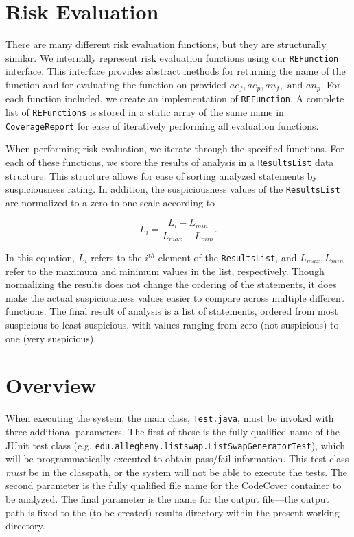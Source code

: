 \section{Risk Evaluation} \label{sec:re}

There are many different risk evaluation functions, but they are structurally similar.  We internally
represent risk evaluation functions using our \texttt{REFunction} interface.  This interface provides
abstract methods for returning the name of the function and for evaluating the function on provided
$ae_f, ae_p, an_f, \text{ and } an_p$.  For each function included, we create an implementation of
\texttt{REFunction}.  A complete list of \texttt{REFunctions} is stored in a static array of the
same name in \texttt{CoverageReport} for ease of iteratively performing all evaluation functions.  

When performing risk evaluation, we iterate through the specified functions.  For each of these
functions, we store the results of analysis in a \texttt{ResultsList} data structure.  This
structure allows for ease of sorting analyzed statements by suspiciousness rating.  In addition, the
suspiciousness values of the \texttt{ResultsList} are normalized to a zero-to-one scale according to

\[ L_i = \frac{ L_i - L_{min} }{ L_{max} - L_{min} }. \]

In this equation, $L_i$ refers to the $i^{th}$ element of the \texttt{ResultsList}, and $L_{max}, L_{min}$ refer to the maximum and minimum values in the list, respectively.  Though normalizing the results does
not change the ordering of the statements, it does make the actual suspiciousness values easier to compare
across multiple different functions.  The final result of analysis is a list of statements, ordered from
most suspicious to least suspicious, with values ranging from zero (not suspicious) to one (very 
suspicious).

\section{Overview} \label{sec:over}

When executing the system, the main class, \texttt{Test.java}, must be invoked with three additional
parameters.  The first of these is the fully qualified name of the JUnit test class (e.g. \texttt{edu.allegheny.listswap.ListSwapGeneratorTest}), which will be programmatically executed to
obtain pass/fail information.  This test class \emph{must} be in the classpath, or the system will
not be able to execute the tests.  The second parameter is the fully qualified file name for the 
CodeCover container to be analyzed.  The final parameter is the name for the output file---the 
output path is fixed to the (to be created) results directory within the present working directory.

